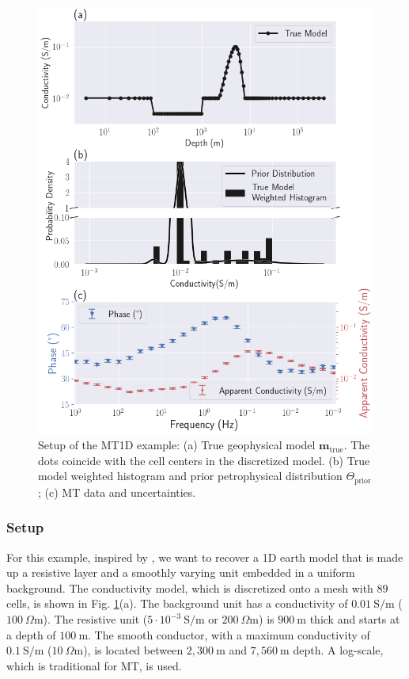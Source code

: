 \documentclass[extra]{gji} %
\begin{document}
\begin{figure}
 \centering
 \includegraphics[width=\columnwidth]{./Fig/LowRes/MT1D_Setup.png}
 \caption[]{Setup of the MT1D example: (a) True geophysical model $\mathbf{m}_{\text{true}}$. The dots coincide with the cell centers in the discretized model. (b) True model weighted histogram and prior petrophysical distribution $\Theta_{\text{prior}}$; (c) MT data and uncertainties.}
 \label{fig:MT1D_Setup}
\end{figure}

\subsubsection{Setup}

For this example, inspired by \cite{tle-MT1D}, we want to recover a 1D earth model that is made up a resistive layer and a smoothly varying unit embedded in a uniform background. The conductivity model, which is discretized onto a mesh with $89$ cells, is shown in Fig. \ref{fig:MT1D_Setup}(a). The background unit has a conductivity of $0.01~\text{S/m}$ ($100~\Omega \text{m}$). The resistive unit ($5\cdot10^{-3}~\text{S/m}$ or $200~\Omega \text{m}$) is $900~\text{m}$ thick and starts at a depth of $100~\text{m}$. The smooth conductor, with a maximum conductivity of $0.1~\text{S/m}$ ($10~\Omega \text{m}$), is located between $2,300~\text{m}$ and $7,560~\text{m}$ depth. A log-scale, which is traditional for MT, is used.
\end{document}
